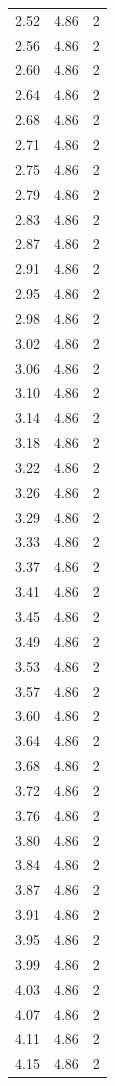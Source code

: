 \begin{longtable}{lrr}
  2.52 & 4.86 & 2 \\
  2.56 & 4.86 & 2 \\
  2.60 & 4.86 & 2 \\
  2.64 & 4.86 & 2 \\
  2.68 & 4.86 & 2 \\
  2.71 & 4.86 & 2 \\
  2.75 & 4.86 & 2 \\
  2.79 & 4.86 & 2 \\
  2.83 & 4.86 & 2 \\
  2.87 & 4.86 & 2 \\
  2.91 & 4.86 & 2 \\
  2.95 & 4.86 & 2 \\
  2.98 & 4.86 & 2 \\
  3.02 & 4.86 & 2 \\
  3.06 & 4.86 & 2 \\
  3.10 & 4.86 & 2 \\
  3.14 & 4.86 & 2 \\
  3.18 & 4.86 & 2 \\
  3.22 & 4.86 & 2 \\
  3.26 & 4.86 & 2 \\
  3.29 & 4.86 & 2 \\
  3.33 & 4.86 & 2 \\
  3.37 & 4.86 & 2 \\
  3.41 & 4.86 & 2 \\
  3.45 & 4.86 & 2 \\
  3.49 & 4.86 & 2 \\
  3.53 & 4.86 & 2 \\
  3.57 & 4.86 & 2 \\
  3.60 & 4.86 & 2 \\
  3.64 & 4.86 & 2 \\
  3.68 & 4.86 & 2 \\
  3.72 & 4.86 & 2 \\
  3.76 & 4.86 & 2 \\
  3.80 & 4.86 & 2 \\
  3.84 & 4.86 & 2 \\
  3.87 & 4.86 & 2 \\
  3.91 & 4.86 & 2 \\
  3.95 & 4.86 & 2 \\
  3.99 & 4.86 & 2 \\
  4.03 & 4.86 & 2 \\
  4.07 & 4.86 & 2 \\
  4.11 & 4.86 & 2 \\
  4.15 & 4.86 & 2 \\

\end{longtable}
